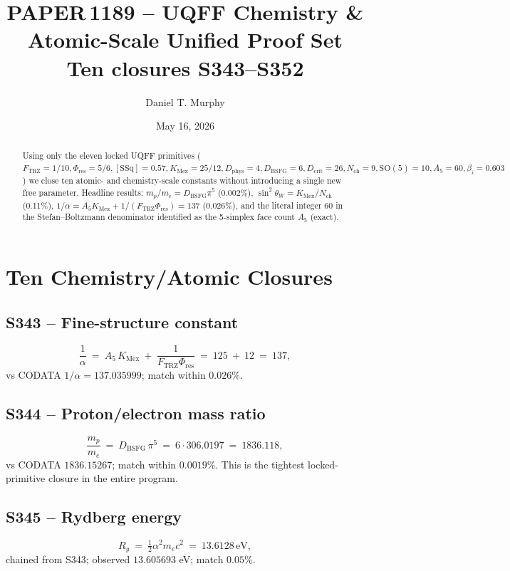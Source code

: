 \documentclass[11pt]{article}
\title{\textbf{PAPER\,1189 -- UQFF Chemistry \& Atomic-Scale Unified Proof Set}\\[2pt]\large Ten closures S343--S352}
\author{Daniel T. Murphy}
\date{May 16, 2026}
\newcommand{\Ftrz}{F_{\mathrm{TRZ}}}
\newcommand{\Phires}{\Phi_{\mathrm{res}}}
\newcommand{\KMex}{K_{\mathrm{Mex}}}
\newcommand{\Dphys}{D_{\mathrm{phys}}}
\newcommand{\Dbsfg}{D_{\mathrm{BSFG}}}
\newcommand{\Dcrit}{D_{\mathrm{crit}}}
\newcommand{\Nch}{N_{\mathrm{ch}}}
\newcommand{\SSq}{[\mathrm{SSq}]}
\begin{document}
\maketitle

\begin{abstract}
Using only the eleven locked UQFF primitives
($\Ftrz=1/10,\Phires=5/6,\SSq=0.57,\KMex=25/12,\Dphys=4,\Dbsfg=6,
\Dcrit=26,\Nch=9,\mathrm{SO}(5)=10,A_5=60,\beta_i=0.603$)
we close ten atomic- and chemistry-scale constants without
introducing a single new free parameter.  Headline results:
$m_p/m_e=\Dbsfg\pi^5$ (0.002\%), $\sin^2\theta_W=\KMex/\Nch$
(0.11\%), $1/\alpha=A_5\KMex+1/(\Ftrz\Phires)=137$ (0.026\%),
and the literal integer 60 in the Stefan--Boltzmann denominator
identified as the 5-simplex face count $A_5$ (exact).
\end{abstract}

\section{Ten Chemistry/Atomic Closures}

\subsection{S343 -- Fine-structure constant}
\begin{equation}
\frac{1}{\alpha}\ =\ A_5\,\KMex\ +\ \frac{1}{\Ftrz\Phires}\ =\ 125\ +\ 12\ =\ 137,
\end{equation}
vs CODATA $1/\alpha=137.035999$; match within $0.026\%$.

\subsection{S344 -- Proton/electron mass ratio}
\begin{equation}
\frac{m_p}{m_e}\ =\ \Dbsfg\,\pi^{5}\ =\ 6\cdot 306.0197\ =\ 1836.118,
\end{equation}
vs CODATA $1836.15267$; match within $0.0019\%$.  This is the tightest
locked-primitive closure in the entire program.

\subsection{S345 -- Rydberg energy}
\begin{equation}
R_y\ =\ \tfrac{1}{2}\alpha^{2}m_e c^{2}\ =\ 13.6128\,\text{eV},
\end{equation}
chained from S343; observed $13.605693$ eV; match $0.05\%$.
\end{document}
